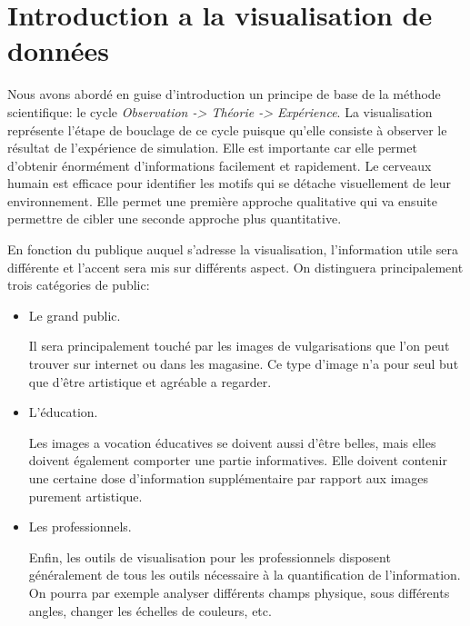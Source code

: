 \section{Introduction a la visualisation de données}


Nous avons abordé en guise d'introduction un principe de base de la méthode scientifique: le cycle \textit{Observation -> Théorie -> Expérience}.
La visualisation représente l'étape de bouclage de ce cycle  puisque qu'elle consiste à observer le résultat de l'expérience de simulation.
Elle est importante car elle permet d'obtenir énormément d'informations facilement et rapidement.
Le cerveaux humain est efficace pour identifier les motifs qui se détache visuellement de leur environnement.
Elle permet une première approche qualitative qui va ensuite permettre de cibler une seconde approche plus quantitative.



En fonction du publique auquel s'adresse la visualisation, l'information utile sera différente et l'accent sera mis sur différents aspect.
On distinguera principalement trois catégories de public:

\begin{itemize}
\item Le grand public. 
 
Il sera principalement touché par les images de vulgarisations que l'on peut trouver sur internet ou dans les magasine.
Ce type d'image n'a pour seul but que d'être artistique et agréable a regarder.

\item L'éducation.

Les images a vocation éducatives se doivent aussi d'être belles, mais elles doivent également comporter une partie informatives.
Elle doivent contenir une certaine dose d'information supplémentaire par rapport aux images purement artistique.

\item Les professionnels.

Enfin, les outils de visualisation pour les professionnels disposent généralement de tous les outils nécessaire à la quantification de l'information.
On pourra par exemple analyser différents champs physique, sous différents angles, changer les échelles de couleurs, etc.

\end{itemize}


